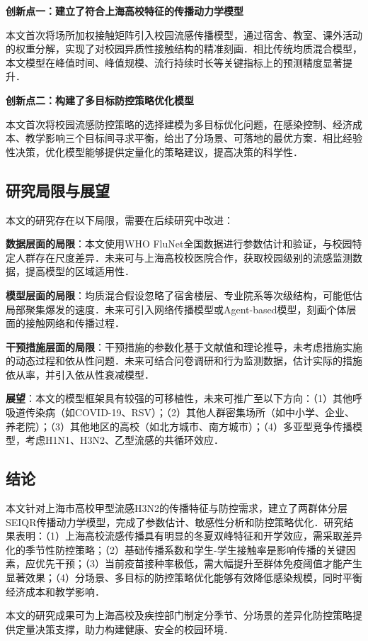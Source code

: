 \textbf{创新点一：建立了符合上海高校特征的传播动力学模型}

本文首次将场所加权接触矩阵引入校园流感传播模型，通过宿舍、教室、课外活动的权重分解，实现了对校园异质性接触结构的精准刻画．相比传统均质混合模型，本文模型在峰值时间、峰值规模、流行持续时长等关键指标上的预测精度显著提升．

\textbf{创新点二：构建了多目标防控策略优化模型}

本文首次将校园流感防控策略的选择建模为多目标优化问题，在感染控制、经济成本、教学影响三个目标间寻求平衡，给出了分场景、可落地的最优方案．相比经验性决策，优化模型能够提供定量化的策略建议，提高决策的科学性．

\subsection{研究局限与展望}

本文的研究存在以下局限，需要在后续研究中改进：

\textbf{数据层面的局限}：本文使用WHO FluNet全国数据进行参数估计和验证，与校园特定人群存在尺度差异．未来可与上海高校校医院合作，获取校园级别的流感监测数据，提高模型的区域适用性．

\textbf{模型层面的局限}：均质混合假设忽略了宿舍楼层、专业院系等次级结构，可能低估局部聚集爆发的速度．未来可引入网络传播模型或Agent-based模型，刻画个体层面的接触网络和传播过程．

\textbf{干预措施层面的局限}：干预措施的参数化基于文献值和理论推导，未考虑措施实施的动态过程和依从性问题．未来可结合问卷调研和行为监测数据，估计实际的措施依从率，并引入依从性衰减模型．

\textbf{展望}：本文的模型框架具有较强的可移植性，未来可推广至以下方向：（1）其他呼吸道传染病（如COVID-19、RSV）；（2）其他人群密集场所（如中小学、企业、养老院）；（3）其他地区的高校（如北方城市、南方城市）；（4）多亚型竞争传播模型，考虑H1N1、H3N2、乙型流感的共循环效应．

\subsection{结论}

本文针对上海市高校甲型流感H3N2的传播特征与防控需求，建立了两群体分层SEIQR传播动力学模型，完成了参数估计、敏感性分析和防控策略优化．研究结果表明：（1）上海高校流感传播具有明显的冬夏双峰特征和开学效应，需采取差异化的季节性防控策略；（2）基础传播系数和学生-学生接触率是影响传播的关键因素，应优先干预；（3）当前疫苗接种率极低，需大幅提升至群体免疫阈值才能产生显著效果；（4）分场景、多目标的防控策略优化能够有效降低感染规模，同时平衡经济成本和教学影响．

本文的研究成果可为上海高校及疾控部门制定分季节、分场景的差异化防控策略提供定量决策支撑，助力构建健康、安全的校园环境．
